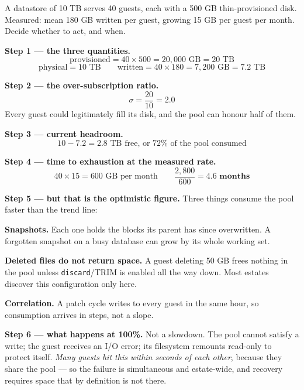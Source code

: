 \begin{worked}
A datastore of 10 TB serves 40 guests, each with a 500 GB thin-provisioned
disk. Measured: mean 180 GB written per guest, growing 15 GB per guest per
month. Decide whether to act, and when.

\smallskip
\textbf{Step 1 --- the three quantities.}
\[ \text{provisioned} = 40 \times 500 = 20{,}000 \text{ GB} = 20 \text{ TB} \]
\[ \text{physical} = 10 \text{ TB} \qquad
   \text{written} = 40 \times 180 = 7{,}200 \text{ GB} = 7.2 \text{ TB} \]

\smallskip
\textbf{Step 2 --- the over-subscription ratio.}
\[ \sigma = \frac{20}{10} = \mathbf{2.0} \]
Every guest could legitimately fill its disk, and the pool can honour half of
them.

\smallskip
\textbf{Step 3 --- current headroom.}
\[ 10 - 7.2 = 2.8 \text{ TB free, or } 72\% \text{ of the pool consumed} \]

\smallskip
\textbf{Step 4 --- time to exhaustion at the measured rate.}
\[ 40 \times 15 = 600 \text{ GB per month} \qquad
   \frac{2{,}800}{600} = \mathbf{4.6 \text{ months}} \]

\smallskip
\textbf{Step 5 --- but that is the optimistic figure.} Three things consume the
pool faster than the trend line:
\begin{tight}
  \item \textbf{Snapshots.} Each one holds the blocks its parent has since
        overwritten. A forgotten snapshot on a busy database can grow by its
        whole working set.
  \item \textbf{Deleted files do not return space.} A guest deleting 50 GB
        frees nothing in the pool unless \texttt{discard}/TRIM is enabled all
        the way down. Most estates discover this configuration only here.
  \item \textbf{Correlation.} A patch cycle writes to every guest in the same
        hour, so consumption arrives in steps, not a slope.
\end{tight}

\smallskip
\textbf{Step 6 --- what happens at 100\%.} Not a slowdown. The pool cannot
satisfy a write; the guest receives an I/O error; its filesystem remounts
read-only to protect itself. \emph{Many guests hit this within seconds of each
other}, because they share the pool --- so the failure is simultaneous and
estate-wide, and recovery requires space that by definition is not there.


\end{worked}
